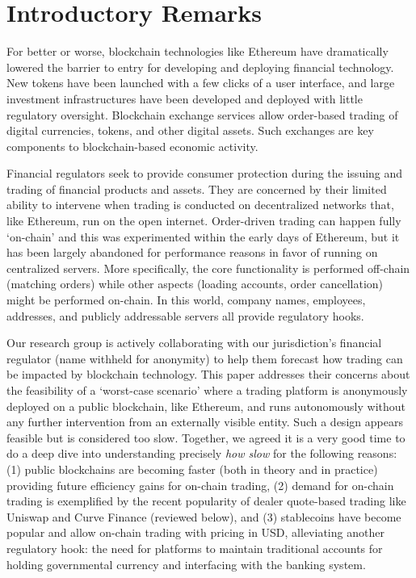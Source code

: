 
\section{Introductory Remarks}

For better or worse, blockchain technologies like Ethereum have dramatically lowered the barrier to entry for developing and deploying financial technology. New tokens have been launched with a few clicks of a user interface, and large investment infrastructures have been developed and deployed with little regulatory oversight. Blockchain exchange services allow order-based trading of digital currencies, tokens, and other digital assets. Such exchanges are key components to blockchain-based economic activity. 

Financial regulators seek to provide consumer protection during the issuing and trading of financial products and assets. They are concerned by their limited ability to intervene when trading is conducted on decentralized networks that, like Ethereum, run on the open internet. Order-driven trading can happen fully `on-chain' and this was experimented within the early days of Ethereum, but it has been largely abandoned for performance reasons in favor of running on centralized servers. More specifically, the core functionality is performed off-chain (\eg matching orders) while other aspects (\eg loading accounts, order cancellation) might be performed on-chain. In this world, company names, employees, addresses, and publicly addressable servers all provide regulatory hooks.


Our research group is actively collaborating with our jurisdiction's financial regulator (name withheld for anonymity) to help them forecast how trading can be impacted by blockchain technology. This paper addresses their concerns about the feasibility of a `worst-case scenario' where a trading platform is anonymously deployed on a public blockchain, like Ethereum, and runs autonomously without any further intervention from an externally visible entity. Such a design appears feasible but is considered too slow. Together, we agreed it is a very good time to do a deep dive into understanding precisely \textit{how slow} for the following reasons: (1) public blockchains are becoming faster (both in theory and in practice) providing future efficiency gains for on-chain trading, (2) demand for on-chain trading is exemplified by the recent popularity of dealer quote-based trading like Uniswap and Curve Finance (reviewed below), and (3) stablecoins have become popular and allow on-chain trading with pricing in USD, alleviating another regulatory hook: the need for platforms to maintain traditional accounts for holding governmental currency and interfacing with the banking system.

